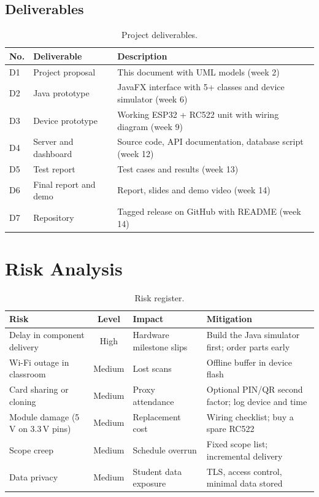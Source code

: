 \documentclass[11pt,a4paper]{article}
\begin{document}
\subsection{Deliverables}
\begin{table}[H]
\centering
\small
\begin{tabular}{llp{6.5cm}}
\toprule
\textbf{No.} & \textbf{Deliverable} & \textbf{Description}\\
\midrule
D1 & Project proposal & This document with UML models (week 2)\\
D2 & Java prototype & JavaFX interface with 5+ classes and device simulator (week 6)\\
D3 & Device prototype & Working ESP32 + RC522 unit with wiring diagram (week 9)\\
D4 & Server and dashboard & Source code, API documentation, database script (week 12)\\
D5 & Test report & Test cases and results (week 13)\\
D6 & Final report and demo & Report, slides and demo video (week 14)\\
D7 & Repository & Tagged release on GitHub with README (week 14)\\
\bottomrule
\end{tabular}
\caption{Project deliverables.}
\end{table}
 
\section{Risk Analysis}
\begin{table}[H]
\centering
\small
\begin{tabular}{p{3.4cm}cp{3.2cm}p{4.5cm}}
\toprule
\textbf{Risk} & \textbf{Level} & \textbf{Impact} & \textbf{Mitigation}\\
\midrule
Delay in component delivery & High & Hardware milestone slips & Build the Java simulator first; order parts early\\
Wi-Fi outage in classroom & Medium & Lost scans & Offline buffer in device flash\\
Card sharing or cloning & Medium & Proxy attendance & Optional PIN/QR second factor; log device and time\\
Module damage (5\,V on 3.3\,V pins) & Medium & Replacement cost & Wiring checklist; buy a spare RC522\\
Scope creep & Medium & Schedule overrun & Fixed scope list; incremental delivery\\
Data privacy & Medium & Student data exposure & TLS, access control, minimal data stored\\
\bottomrule
\end{tabular}
\caption{Risk register.}
\end{table}
 
\end{document}
